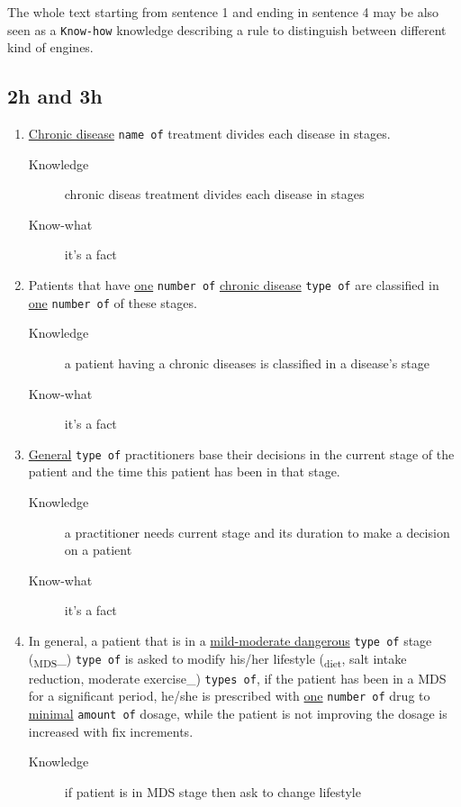 \documentclass[a4paper,10pt,twoside,twocolumn]{article}
\begin{document}
The whole text starting from sentence 1 and ending in sentence 4 may be also seen as a \texttt{Know-how} knowledge describing a rule to distinguish between different kind of engines.

\subsection{2h and 3h}
\label{sec:orgbe33df2}
\begin{enumerate}
\item \uline{Chronic disease} \texttt{name of} treatment divides each disease in stages.
\begin{description}
\item[{Knowledge}] chronic diseas treatment divides each disease in stages
\item[{Know-what}] it's a fact
\end{description}
\item Patients that have \uline{one} \texttt{number of} \uline{chronic disease} \texttt{type of} are classified in \uline{one} \texttt{number of} of these stages.
\begin{description}
\item[{Knowledge}] a patient having a chronic diseases is classified in a disease's stage
\item[{Know-what}] it's a fact
\end{description}
\item \uline{General} \texttt{type of} practitioners base their decisions in the current stage of the patient and the time this patient has been in that stage.
\begin{description}
\item[{Knowledge}] a practitioner needs current stage and its duration to make a decision on a patient
\item[{Know-what}] it's a fact
\end{description}
\item In general, a patient that is in a \uline{mild-moderate dangerous} \texttt{type of} stage (\textsubscript{MDS}\_) \texttt{type of} is asked to modify his/her lifestyle (\textsubscript{diet}, salt intake reduction, moderate exercise\_) \texttt{types of}, if the patient has been in a MDS for a significant period, he/she is prescribed with \uline{one} \texttt{number of} drug to \uline{minimal} \texttt{amount of} dosage, while the patient is not improving the dosage is increased with fix increments.
\begin{description}
\item[{Knowledge}] if patient is in MDS stage then ask to change lifestyle

\end{description}
\end{enumerate}
\end{document}
